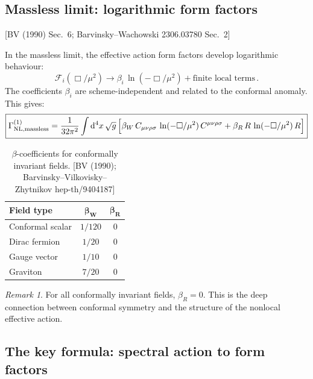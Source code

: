 \documentclass[12pt,a4paper]{article}
\theoremstyle{definition}
\theoremstyle{remark}
\newtheorem{remark}[proposition]{Remark}
\newcommand{\dd}{\mathrm{d}}
\newcommand{\fromlit}[1]{\textcolor{blue!70!black}{\textsf{[#1]}}}
\begin{document}
\subsection{Massless limit: logarithmic form factors}

\fromlit{BV (1990) Sec.~6; Barvinsky--Wachowski 2306.03780 Sec.~2}

In the massless limit, the effective action form factors develop
logarithmic behaviour:
\begin{equation}
  \mathcal{F}_i(\Box/\mu^2)
  \to \beta_i\,\ln(-\Box/\mu^2)
  + \text{finite local terms}\,.
  \label{eq:log-ff}
\end{equation}
The coefficients $\beta_i$ are scheme-independent and related to the
conformal anomaly.  This gives:
\begin{equation}
  \boxed{
  \Gamma^{(1)}_{\text{NL,massless}}
  = \frac{1}{32\pi^2}\int\dd^4 x\,\sqrt{g}\,\Bigl[
  \beta_W\, C_{\mu\nu\rho\sigma}\,
    \ln(-\Box/\mu^2)\, C^{\mu\nu\rho\sigma}
  + \beta_R\, R\,\ln(-\Box/\mu^2)\, R
  \Bigr]
  }
  \label{eq:log-action}
\end{equation}

\begin{table}[h]
\centering
\renewcommand{\arraystretch}{1.3}
\begin{tabular}{@{}lcc@{}}
\toprule
\textbf{Field type} & $\boldsymbol{\beta_W}$ & $\boldsymbol{\beta_R}$ \\
\midrule
Conformal scalar  & $1/120$  & $0$    \\
Dirac fermion     & $1/20$   & $0$    \\
Gauge vector      & $1/10$   & $0$    \\
Graviton          & $7/20$   & $0$    \\
\bottomrule
\end{tabular}
\caption{$\beta$-coefficients for conformally invariant fields.
\fromlit{BV (1990); Barvinsky--Vilkovisky--Zhytnikov hep-th/9404187}}
\label{tab:betas}
\end{table}

\begin{remark}
For all conformally invariant fields, $\beta_R = 0$.
This is the deep connection between conformal symmetry
and the structure of the nonlocal effective action.
\end{remark}


\subsection{The key formula: spectral action to form factors}
\end{document}
